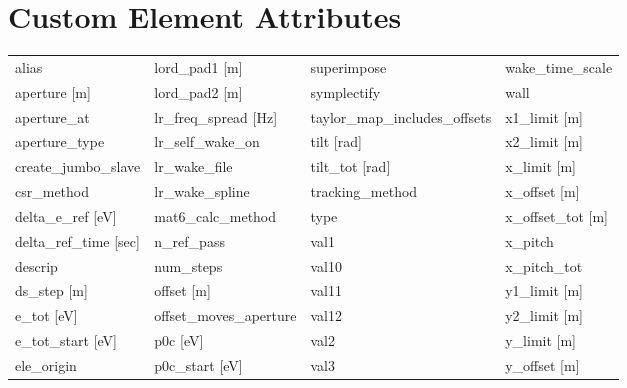  \section{Custom Element Attributes}
 \label{s:list.custom}
 
 \begin{tabular}{llll} \toprule
alias                          & lord_pad1 [m]                  & superimpose                    & wake_time_scale                \\
aperture [m]                   & lord_pad2 [m]                  & symplectify                    & wall                           \\
aperture_at                    & lr_freq_spread [Hz]            & taylor_map_includes_offsets    & x1_limit [m]                   \\
aperture_type                  & lr_self_wake_on                & tilt [rad]                     & x2_limit [m]                   \\
create_jumbo_slave             & lr_wake_file                   & tilt_tot [rad]                 & x_limit [m]                    \\
csr_method                     & lr_wake_spline                 & tracking_method                & x_offset [m]                   \\
delta_e_ref [eV]               & mat6_calc_method               & type                           & x_offset_tot [m]               \\
delta_ref_time [sec]           & n_ref_pass                     & val1                           & x_pitch                        \\
descrip                        & num_steps                      & val10                          & x_pitch_tot                    \\
ds_step [m]                    & offset [m]                     & val11                          & y1_limit [m]                   \\
e_tot [eV]                     & offset_moves_aperture          & val12                          & y2_limit [m]                   \\
e_tot_start [eV]               & p0c [eV]                       & val2                           & y_limit [m]                    \\
ele_origin                     & p0c_start [eV]                 & val3                           & y_offset [m]                   \\

\end{tabular}
